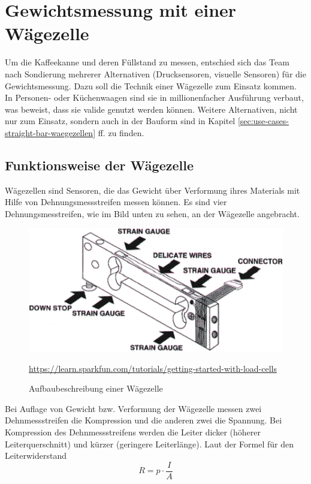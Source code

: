 \chapter{Gewichtsmessung mit einer Wägezelle}
Um die Kaffeekanne und deren Füllstand zu messen, entschied sich das Team nach Sondierung mehrerer Alternativen (Drucksensoren, visuelle Sensoren) für die Gewichtsmessung. Dazu soll die Technik einer Wägezelle zum Einsatz kommen. In Personen- oder Küchenwaagen sind sie in millionenfacher Ausführung verbaut, was beweist, dass sie valide genutzt werden können. Weitere Alternativen, nicht nur zum Einsatz, sondern auch in der Bauform sind in Kapitel \ref{sec:use-cases-straight-bar-waegezellen} ff. zu finden.
\section{Funktionsweise der Wägezelle}
Wägezellen sind Sensoren, die das Gewicht über Verformung ihres Materials mit Hilfe von Dehnungsmessstreifen messen können. Es sind vier Dehnungsmesstreifen, wie im Bild unten zu sehen, an der Wägezelle angebracht.
\begin{figure}[H]
    \center
    \includegraphics[width=15cm]{Bilder/waegezelle-aufbaubeschreibung.jpg}\\
    \caption{Aufbaubeschreibung einer Wägezelle}
    \begin{flushleft} \quelle\url{https://learn.sparkfun.com/tutorials/getting-started-with-load-cells} \end{flushleft}
\end{figure}
\noindent
Bei Auflage von Gewicht bzw. Verformung der Wägezelle messen zwei Dehnmessstreifen die Kompression und die anderen zwei die Spannung. Bei Kompression des Dehnmessstreifens werden die Leiter dicker (höherer Leiterquerschnitt) und kürzer (geringere Leiterlänge). Laut der Formel für den Leiterwiderstand 
\begin{equation}
    R=p \cdot \frac{I}{A}
\end{equation}
